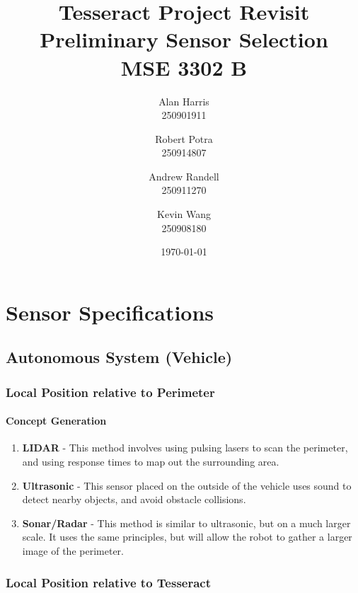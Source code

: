 \documentclass[12pt]{article}
\begin{document}
\title{\textbf{Tesseract Project Revisit\\Preliminary Sensor Selection\\ MSE 3302 B}}
\author{
  Alan Harris\\
  250901911
  \and
  Robert Potra\\
  250914807
  \and
  Andrew Randell\\
  250911270
  \and
  Kevin Wang\\
  250908180
}
\date{\today}
\maketitle

\tableofcontents
\thispagestyle{empty}

\pagebreak
\setcounter{page}{1}

\section{Sensor Specifications}
\subsection{Autonomous System (Vehicle)}
\subsubsection{Local Position relative to Perimeter}
\paragraph{Concept Generation}

\begin{enumerate}
\item \textbf{LIDAR} - This method involves using pulsing lasers to scan the perimeter, and using response times to map out the surrounding area.

\item \textbf{Ultrasonic} - This sensor placed on the outside of the vehicle uses sound to detect nearby objects, and avoid obstacle collisions.

\item \textbf{Sonar/Radar} - This method is similar to ultrasonic, but on a much larger scale. It uses the same principles, but will allow the robot to gather a larger image of the perimeter.
\end{enumerate}


\subsubsection{Local Position relative to Tesseract}
\end{document}
